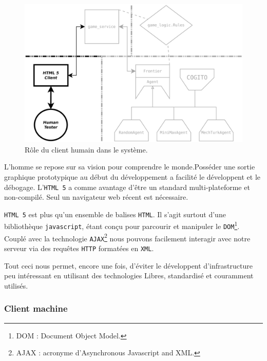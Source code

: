 \begin{figure}[H] 
\centering
\includegraphics[width=\textwidth]{files/william/archi_client_humain} 
\caption{Rôle du client humain dans le système.} 
\end{figure} 

L'homme se repose sur sa vision pour comprendre le monde.Posséder une sortie graphique prototypique au début du développement a facilité le développent et le débogage. L'\texttt{HTML 5} a comme avantage d'être un standard multi-plateforme et non-compilé. Seul un navigateur web récent est nécessaire.

\og \texttt{HTML 5} \fg{} est plus qu'un ensemble de balises \texttt{HTML}. Il s'agit surtout d'une bibliothèque \texttt{javascript}, étant conçu pour parcourir et manipuler le \texttt{DOM}\footnote{DOM : Document Object Model.}. Couplé avec la technologie \texttt{AJAX}\footnote{AJAX : acronyme d'Asynchronous Javascript and XML.} nous pouvons facilement interagir avec notre serveur via des requêtes \texttt{HTTP} formatées en \texttt{XML}.

Tout ceci nous permet, encore une fois, d'éviter le développent d'infrastructure peu intéressant en utilisant des technologies Libres, standardisé et couramment utilisés.   

\subsubsection{Client machine}

